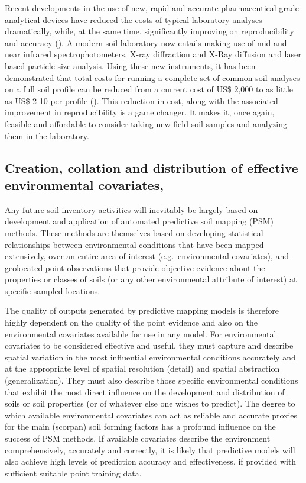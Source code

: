\documentclass[graybox,natbib,nospthms,UStrade]{svmono}
\begin{document}
Recent developments in the use of new, rapid and accurate pharmaceutical
grade analytical devices have reduced the costs of typical laboratory
analyses dramatically, while, at the same time, significantly improving
on reproducibility and accuracy (\citet{ShepherdJNIS2007}). A modern soil laboratory now entails
making use of mid and near infrared spectrophotometers, X-ray
diffraction and X-Ray diffusion and laser based particle size analysis.
Using these new instruments, it has been demonstrated that total costs
for running a complete set of common soil analyses on a full soil
profile can be reduced from a current cost of US\$ 2,000 to as little as
US\$ 2-10 per profile (\citet{ShepherdJNIS2007}).
This reduction in cost, along with the associated improvement in
reproducibility is a game changer. It makes it, once again, feasible and
affordable to consider taking new field soil samples and analyzing them
in the laboratory.

\hypertarget{creation-collation-and-distribution-of-effective-environmental-covariates}{%
\subsection{Creation, collation and distribution of effective environmental covariates,}\label{creation-collation-and-distribution-of-effective-environmental-covariates}}

Any future soil inventory activities will inevitably be largely based on
development and application of automated predictive soil mapping (PSM)
methods. These methods are themselves based on developing statistical
relationships between environmental conditions that have been mapped
extensively, over an entire area of interest (e.g.~environmental
covariates), and geolocated point observations that provide objective
evidence about the properties or classes of soils (or any other
environmental attribute of interest) at specific sampled locations.

The quality of outputs generated by predictive mapping models is
therefore highly dependent on the quality of the point evidence and also
on the environmental covariates available for use in any model. For
environmental covariates to be considered effective and useful, they
must capture and describe spatial variation in the most influential
environmental conditions accurately and at the appropriate level of
spatial resolution (detail) and spatial abstraction (generalization).
They must also describe those specific environmental conditions that
exhibit the most direct influence on the development and distribution of
soils or soil properties (or of whatever else one wishes to predict).
The degree to which available environmental covariates can act as
reliable and accurate proxies for the main (scorpan) soil forming
factors has a profound influence on the success of PSM methods. If
available covariates describe the environment comprehensively,
accurately and correctly, it is likely that predictive models will also
achieve high levels of prediction accuracy and effectiveness, if
provided with sufficient suitable point training data.
\end{document}
